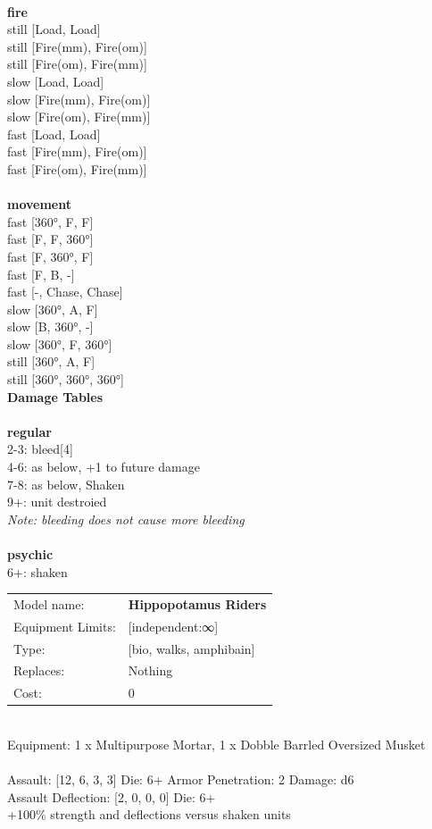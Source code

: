 \ \\ {\bf fire } \\
still [Load, Load] \\
still [Fire(mm), Fire(om)] \\
still [Fire(om), Fire(mm)] \\
slow [Load, Load] \\
slow [Fire(mm), Fire(om)] \\
slow [Fire(om), Fire(mm)] \\
fast [Load, Load] \\
fast [Fire(mm), Fire(om)] \\
fast [Fire(om), Fire(mm)] \\
\ \\ {\bf movement } \\
fast [360°, F, F] \\
fast [F, F, 360°] \\
fast [F, 360°, F] \\
fast [F, B, -] \\
fast [-, Chase, Chase] \\
slow [360°, A, F] \\
slow [B, 360°, -] \\
slow [360°, F, 360°] \\
still [360°, A, F] \\
still [360°, 360°, 360°] \\


{\bf Damage Tables} \\
\ \\ {\bf regular } \\
2-3: bleed[4] \\
4-6: as below, +1 to future damage \\
7-8: as below, Shaken \\
9+: unit destroied \\
{{\it Note: bleeding does not cause more bleeding}} \\
\ \\ {\bf psychic } \\
6+: shaken \\


\noindent
\begin{tabular}{ll}
Model name: &{\bf Hippopotamus Riders } \\
Equipment Limits: &[independent:∞] \\
Type: &[bio, walks, amphibain] \\
Replaces: &Nothing \\
Cost: & 0\\
\end{tabular}
\ \\
Equipment: 1 x Multipurpose Mortar, 1 x Dobble Barrled Oversized Musket \\
\ \\
Assault: [12, 6, 3, 3] Die: 6+ Armor Penetration: 2 Damage: d6 \\
Assault Deflection: [2, 0, 0, 0] Die: 6+\\
\indent +100\% strength and deflections versus shaken units\\ 
 

